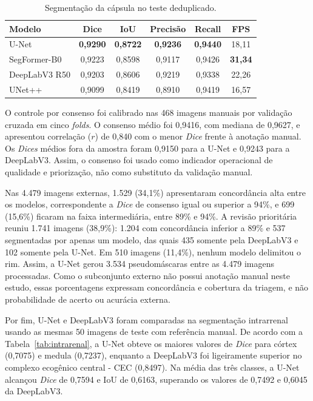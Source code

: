 \documentclass[12pt]{article}
\begin{document}
\begin{table}[htb!]
\centering
\caption{Segmentação da cápsula no teste deduplicado.}
\label{tab:capsule}
\begin{tabular}{lccccc}
\hline
\textbf{Modelo} & \textbf{Dice} & \textbf{IoU} & \textbf{Precisão} & \textbf{Recall} & \textbf{FPS} \\
\hline
\mbox{U-Net} & \textbf{0,9290} & \textbf{0,8722} & \textbf{0,9236} & \textbf{0,9440} & 18,11 \\
SegFormer-B0 & 0,9223 & 0,8598 & 0,9117 & 0,9426 & \textbf{31,34} \\
DeepLabV3 R50 & 0,9203 & 0,8606 & 0,9219 & 0,9338 & 22,26 \\
UNet++ & 0,9099 & 0,8419 & 0,8910 & 0,9419 & 16,57 \\
\hline
\end{tabular}
\end{table}

O controle por consenso foi calibrado nas 468 imagens manuais por validação cruzada em cinco \textit{folds}. O consenso médio foi 0,9416, com mediana de 0,9627, e apresentou correlação ($r$) de 0,840 com o menor \textit{Dice} frente à anotação manual. Os \textit{Dices} médios fora da amostra foram 0,9150 para a U-Net e 0,9243 para a DeepLabV3. Assim, o consenso foi usado como indicador operacional de qualidade e priorização, não como substituto da validação manual.

Nas 4.479 imagens externas, 1.529 (34,1\%) apresentaram concordância alta entre os modelos, correspondente a \textit{Dice} de consenso igual ou superior a 94\%, e 699 (15,6\%) ficaram na faixa intermediária, entre 89\% e 94\%. A revisão prioritária reuniu 1.741 imagens (38,9\%): 1.204 com concordância inferior a 89\% e 537 segmentadas por apenas um modelo, das quais 435 somente pela DeepLabV3 e 102 somente pela U-Net. Em 510 imagens (11,4\%), nenhum modelo delimitou o rim. Assim, a U-Net gerou 3.534 pseudomáscaras entre as 4.479 imagens processadas. Como o subconjunto externo não possui anotação manual neste estudo, essas porcentagens expressam concordância e cobertura da triagem, e não probabilidade de acerto ou acurácia externa.

Por fim, U-Net e DeepLabV3 foram comparadas na segmentação intrarrenal usando as mesmas 50 imagens de teste com referência manual. De acordo com a Tabela~\ref{tab:intrarenal}, a U-Net obteve os maiores valores de \textit{Dice} para córtex (0,7075) e medula (0,7237), enquanto a DeepLabV3 foi ligeiramente superior no complexo ecogênico central - CEC (0,8497). Na média das três classes, a U-Net alcançou \textit{Dice} de 0,7594 e IoU de 0,6163, superando os valores de 0,7492 e 0,6045 da DeepLabV3.
\end{document}
